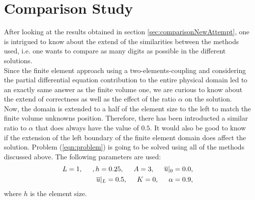 \documentclass[a4paper,12pt]{article}
\begin{document}
\section{Comparison Study}
After looking at the results obtained in section \ref{sec:comparisonNewAttempt}, one is intrigued to know about the extend of the similarities between the methods used, i.e. one wants to compare as many digits as possible in the different solutions.\\
Since the finite element approach using a two-elements-coupling and considering the partial differential equation contribution to the entire physical domain led to an exactly same answer as the finite volume one, we are curious to know about the extend of correctness as well as the effect of the ratio $\alpha$ on the solution. \\
Now, the domain is extended to a half of the element size to the left to match the finite volume unknowns position. Therefore, there has been introducted a similar ratio to $\alpha$ that does always have the value of $0.5$. It would also be good to know if the extension of the left boundary of the finite element domain does affect the solution.
Problem (\ref{eqn:problem}) is going to be solved using all of the methods discussed above. The following parameters are used:
\begin{eqnarray}
L = 1, \hspace{0.5cm}, h = 0.25, \hspace{0.5cm}A= 3, \hspace{0.5cm}\overline{u}\vert_0 = 0.0,\\ 
\overline{u}\vert_L=0.5, \hspace{0.5cm}K = 0,\hspace{0.5cm}\alpha = 0.9,
\end{eqnarray}
where $h$ is the element size.
\end{document}
